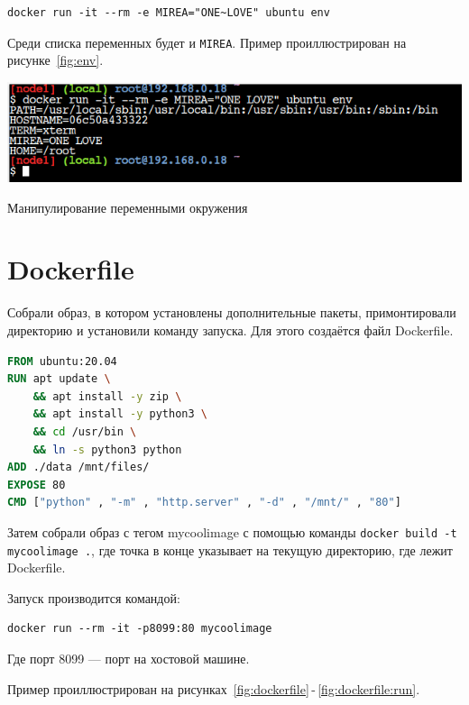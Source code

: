 \begin{verbatim}
docker run -it --rm -e MIREA="ONE~LOVE" ubuntu env
\end{verbatim}

Среди списка переменных будет и \texttt{MIREA}.
Пример проиллюстрирован на рисунке~\ref{fig:env}.

\begin{image}
	\includegraphics[width=1\textwidth]{Screenshot from 2023-04-15 16-26-19}
	\caption{Манипулирование переменными окружения}
	\label{fig:env}
\end{image}

\section{Dockerfile}
Собрали образ, в котором установлены дополнительные пакеты,
примонтировали директорию и установили команду запуска.
Для этого создаётся файл Dockerfile.

\begin{lstlisting}[language=Dockerfile
	, caption=\leftline{Код Dockerfile-а}
	, label=lst:dockerfile]
FROM ubuntu:20.04
RUN apt update \
	&& apt install -y zip \
	&& apt install -y python3 \
	&& cd /usr/bin \
	&& ln -s python3 python
ADD ./data /mnt/files/ 
EXPOSE 80
CMD ["python" , "-m" , "http.server" , "-d" , "/mnt/" , "80"]
\end{lstlisting}

Затем собрали образ с тегом mycoolimage с помощью команды
\texttt{docker build -t mycoolimage .}, где точка в конце указывает
на текущую директорию, где лежит Dockerfile.\par
Запуск производится командой:

\begin{verbatim}
docker run --rm -it -p8099:80 mycoolimage
\end{verbatim}

Где порт 8099 --- порт
на хостовой машине.\par
Пример проиллюстрирован
на рисунках~\ref{fig:dockerfile}\,-\,\ref{fig:dockerfile:run}.

